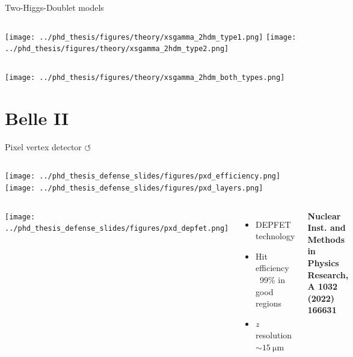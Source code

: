 \documentclass[xcolor=dvipsnames]{beamer}
\begin{document}
\begin{frame}{Two-Higgs-Doublet models}
   \centering
\begin{columns}
   \texttt{[image: ../phd\_thesis/figures/theory/xsgamma\_2hdm\_type1.png]}
   \texttt{[image: ../phd\_thesis/figures/theory/xsgamma\_2hdm\_type2.png]}
\end{columns}

       \texttt{[image: ../phd\_thesis/figures/theory/xsgamma\_2hdm\_both\_types.png]}


  
\end{frame}

\section{Belle II}


\begin{frame}{Pixel vertex detector \hyperlink{frame:A}{$\circlearrowleft$}}

   \scriptsize

   \begin{columns}
      \centering
         \texttt{[image: ../phd\_thesis\_defense\_slides/figures/pxd\_efficiency.png]}
      \centering
         \texttt{[image: ../phd\_thesis\_defense\_slides/figures/pxd\_layers.png]}
   \end{columns}

   \begin{columns}
      \centering
         \texttt{[image: ../phd\_thesis\_defense\_slides/figures/pxd\_depfet.png]}
         \begin{itemize}
            \item DEPFET technology
            \item Hit efficiency ~99\% in good regions
            \item $z$ resolution $\sim15~\si{\micro\meter}$
         \end{itemize}
         {\tiny\textbf{Nuclear Inst. and Methods in Physics Research, A 1032 (2022) 166631}}
   \end{columns}
\end{frame}
\end{document}
